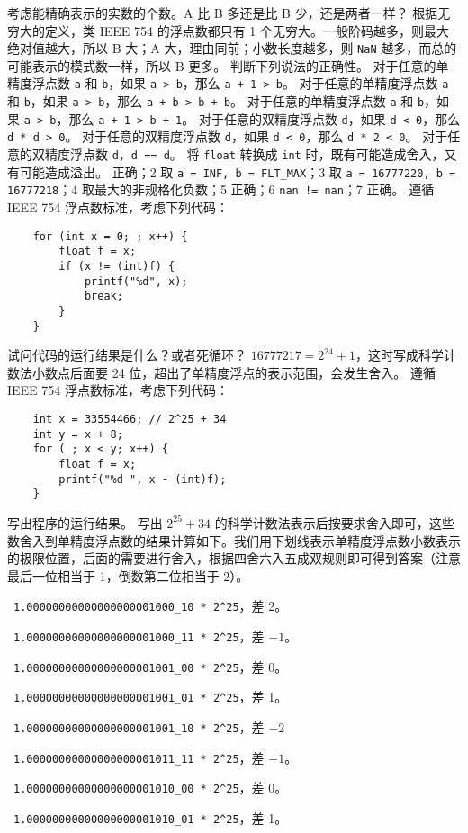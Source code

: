 \begin{problems}
			\qn 考虑能精确表示的实数的个数。A 比 B 多还是比 B 少，还是两者一样？
		\sol 根据无穷大的定义，类 IEEE 754 的浮点数都只有 1 个无穷大。一般阶码越多，则最大绝对值越大，所以 B 大；A 大，理由同前；小数长度越多，则 \verb|NaN| 越多，而总的可能表示的模式数一样，所以 B 更多。
		\pro 判断下列说法的正确性。
			\qn 对于任意的单精度浮点数 \texttt{a} 和 \texttt{b}，如果 \texttt{a > b}，那么 \texttt{a + 1 > b}。
			\qn 对于任意的单精度浮点数 \texttt{a} 和 \texttt{b}，如果 \texttt{a > b}，那么 \texttt{a + b > b + b}。
			\qn 对于任意的单精度浮点数 \texttt{a} 和 \texttt{b}，如果 \texttt{a > b}，那么 \texttt{a + 1 > b + 1}。
			\qn 对于任意的双精度浮点数 \texttt{d}，如果 \texttt{d < 0}，那么 \texttt{d * d > 0}。
			\qn 对于任意的双精度浮点数 \texttt{d}，如果 \texttt{d < 0}，那么 \texttt{d * 2 < 0}。
			\qn 对于任意的双精度浮点数 \texttt{d}，\texttt{d == d}。
			\qn 将 \texttt{float} 转换成 \texttt{int} 时，既有可能造成舍入，又有可能造成溢出。
		 正确；2 取 \verb|a = INF, b = FLT_MAX|；3 取 \verb|a = 16777220, b = 16777218|；4 取最大的非规格化负数；5 正确；6 \verb|nan != nan|；7 正确。
		\pro 遵循 IEEE 754 浮点数标准，考虑下列代码：
		\begin{verbatim}
    for (int x = 0; ; x++) {
        float f = x;
        if (x != (int)f) {
            printf("%d", x);
            break;
        }
    }
		\end{verbatim}
		试问代码的运行结果是什么？或者死循环？
		\sol $16777217=2^{24}+1$，这时写成科学计数法小数点后面要 24 位，超出了单精度浮点的表示范围，会发生舍入。
		\pro 遵循 IEEE 754 浮点数标准，考虑下列代码：
		\begin{verbatim}
    int x = 33554466; // 2^25 + 34
    int y = x + 8;
    for ( ; x < y; x++) {
        float f = x;
        printf("%d ", x - (int)f);
    }
		\end{verbatim}
		写出程序的运行结果。
		\sol 写出 $2^{25}+34$ 的科学计数法表示后按要求舍入即可，这些数舍入到单精度浮点数的结果计算如下。我们用下划线表示单精度浮点数小数表示的极限位置，后面的需要进行舍入，根据四舍六入五成双规则即可得到答案（注意最后一位相当于 1，倒数第二位相当于 2）。
		\begin{compactenum}
			\item \ \verb|1.00000000000000000001000_10 * 2^25|，差 2。
			\item \ \verb|1.00000000000000000001000_11 * 2^25|，差 $-1$。
			\item \ \verb|1.00000000000000000001001_00 * 2^25|，差 0。
			\item \ \verb|1.00000000000000000001001_01 * 2^25|，差 1。
			\item \ \verb|1.00000000000000000001001_10 * 2^25|，差 $-2$
			\item \ \verb|1.00000000000000000001011_11 * 2^25|，差 $-1$。
			\item \ \verb|1.00000000000000000001010_00 * 2^25|，差 0。
			\item \ \verb|1.00000000000000000001010_01 * 2^25|，差 1。
		\end{compactenum}
	\end{problems}

